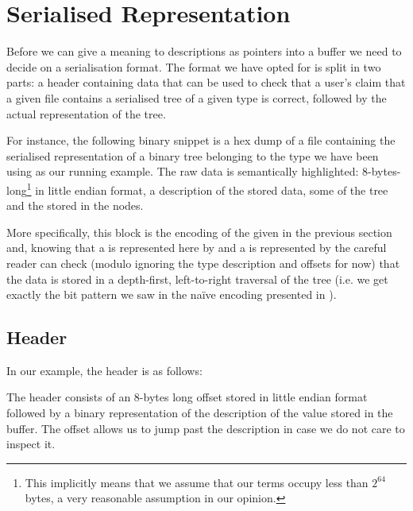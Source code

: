 \section{Serialised Representation}\label{sec:hexdump}

Before we can give a meaning to descriptions as pointers into a buffer we
need to decide on a serialisation format.
%
The format we have opted for is split in two parts: a header containing
data that can be used to check that a user's claim that a given file
contains a serialised tree of a given type is correct, followed by the
actual representation of the tree.


For instance, the following binary snippet is a hex dump of a file
containing the serialised representation of a binary tree belonging to
the type we have been using as our running example.
%
The raw data is semantically highlighted:
8-bytes-long\footnote{This implicitly means that we assume
that our terms occupy less than $2^{64}$ bytes,
a very reasonable assumption in our opinion.}
 in little endian format,
a  description of the stored data,
some  of the tree
and the  stored in the nodes.

\begin{center}

\end{center}

More specifically, this block is the encoding of the 
given in the previous section and,
%
knowing that a  is represented here by 
and a  is represented by 
%
the careful reader can check
(modulo ignoring the type description and offsets for now)
that the data is stored in a depth-first, left-to-right traversal of the tree
(i.e. we get exactly the bit pattern we saw in the naïve encoding
presented in ).


\subsection{Header}

In our example, the header is as follows:
\begin{hexdump}
 
\end{hexdump}

The header consists of an 8-bytes long offset stored in little endian
format followed by a binary representation of the
 description of the value stored in the buffer.
The offset allows us to jump past the description in case we do
not care to inspect it.

